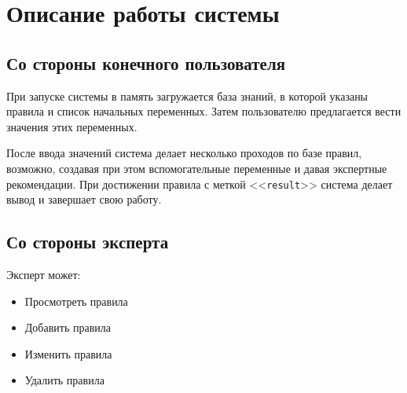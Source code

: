 \section{Описание работы системы}

\subsection{Со стороны конечного пользователя}

При запуске системы в память загружается база знаний, в которой указаны правила и список начальных переменных.
Затем пользователю предлагается вести значения этих переменных.

После ввода значений система делает несколько проходов по базе правил, возможно, создавая при этом вспомогательные переменные и давая экспертные рекомендации.
При достижении правила с меткой <<\texttt{result}>> система делает вывод и завершает свою работу.

\subsection{Со стороны эксперта}

Эксперт может:
\begin{itemize}
	\item Просмотреть правила
	\item Добавить    правила
	\item Изменить    правила
	\item Удалить     правила
\end{itemize}
